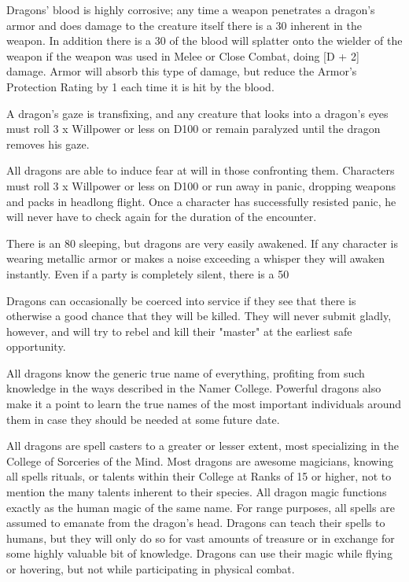 \begin{multicols}{2}
Dragons' blood is highly corrosive; any time a weapon penetrates a
dragon's armor and does damage to the creature itself there is a 30%
inherent in the weapon.  In addition there is a 30%
of the blood will splatter onto the wielder of the weapon if the
weapon was used in Melee or Close Combat, doing [D + 2] damage.  Armor
will absorb this type of damage, but reduce the Armor's Protection
Rating by 1 each time it is hit by the blood.

A dragon's gaze is transfixing, and any creature that looks into a
dragon's eyes must roll 3 x Willpower or less on D100 or remain
paralyzed until the dragon removes his gaze.

All dragons are able to induce fear at will in those confronting
them. Characters must roll 3 x Willpower or less on D100 or run away
in panic, dropping weapons and packs in headlong flight.  Once a
character has successfully resisted panic, he will never have to check
again for the duration of the encounter.

There is an 80%
sleeping, but dragons are very easily awakened.  If any character is
wearing metallic armor or makes a noise exceeding a whisper they will
awaken instantly.  Even if a party is completely silent, there is a
50%

Dragons can occasionally be coerced into service if they see that
there is otherwise a good chance that they will be killed.  They will
never submit gladly, however, and will try to rebel and kill their
"master" at the earliest safe opportunity.

All dragons know the generic true name of everything, profiting from
such knowledge in the ways described in the Namer College. Powerful
dragons also make it a point to learn the true names of the most
important individuals around them in case they should be needed at
some future date.

All dragons are spell casters to a greater or lesser extent, most
specializing in the College of Sorceries of the Mind.  Most dragons
are awesome magicians, knowing all spells rituals, or talents within
their College at Ranks of 15 or higher, not to mention the many
talents inherent to their species.  All dragon magic functions exactly
as the human magic of the same name.  For range purposes, all spells
are assumed to emanate from the dragon's head.  Dragons can teach
their spells to humans, but they will only do so for vast amounts of
treasure or in exchange for some highly valuable bit of knowledge.
Dragons can use their magic while flying or hovering, but not while
participating in physical combat.


\end{multicols}

